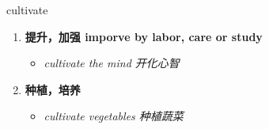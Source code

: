 
\begin{frame}
{\huge cultivate}
\begin{center}
\begin{enumerate}\Large
  \item \textbf{提升，加强 imporve by labor, care or study}
  \begin{itemize}
    \item \em{\Large{cultivate the mind 开化心智}}
  \end{itemize}
  \item \textbf{种植，培养}
  \begin{itemize}
    \item \em{\Large{cultivate vegetables 种植蔬菜}}
  \end{itemize}
\end{enumerate}
\end{center}
\end{frame}
